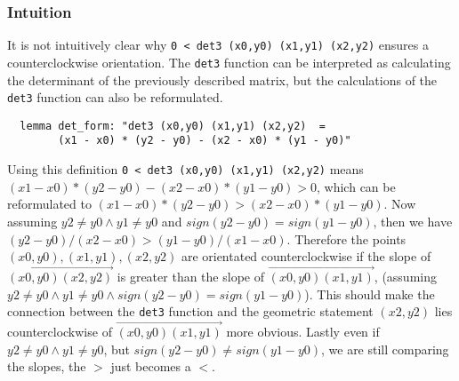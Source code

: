 \subsubsection{Intuition}
\label{det3:intuition}
It is not intuitively clear why \lstinline|0 < det3 (x0,y0) (x1,y1) (x2,y2)| ensures a 
counterclockwise orientation. The \lstinline|det3| function can  be interpreted as calculating 
the determinant of the previously described matrix, but the calculations of the \lstinline|det3|
function can also be reformulated.
\begin{lstlisting}
  lemma det_form: "det3 (x0,y0) (x1,y1) (x2,y2)  =  
        (x1 - x0) * (y2 - y0) - (x2 - x0) * (y1 - y0)" 
\end{lstlisting}
Using this definition \lstinline|0 < det3 (x0,y0) (x1,y1) (x2,y2)| means \newline
$(x1 - x0) * (y2 - y0) - (x2 - x0) * (y1 - y0) > 0$,
which can be reformulated to \newline
$(x1 - x0) * (y2 - y0) >  (x2 - x0) * (y1 - y0)$.
Now assuming $y2 \neq y0 \land y1 \neq y0$ and $sign(y2 - y0) = sign (y1 - y0)$, then
we have \newline $(y2 - y0) / (x2 - x0) >   (y1 - y0) / (x1 - x0)$. Therefore the points 
$(x0,y0),(x1,y1),(x2,y2)$ are orientated counterclockwise if the slope of
$\overrightarrow{(x0,y0) (x2,y2)}$ is greater than the slope of $\overrightarrow{(x0,y0) (x1,y1)}$,
(assuming $y2 \neq y0 \land y1 \neq y0 \land sign(y2 - y0) = sign (y1 - y0)$). 
This should make the connection between the \lstinline|det3| function and the geometric
statement $(x2,y2)$ lies counterclockwise of $\overrightarrow{(x0,y0) (x1,y1)}$ more obvious.
Lastly even if $y2 \neq y0 \land y1 \neq y0 $, but 
$sign(y2 - y0) \neq sign (y1 - y0)$, we are still comparing the slopes, the $>$ just 
becomes a $<$.


